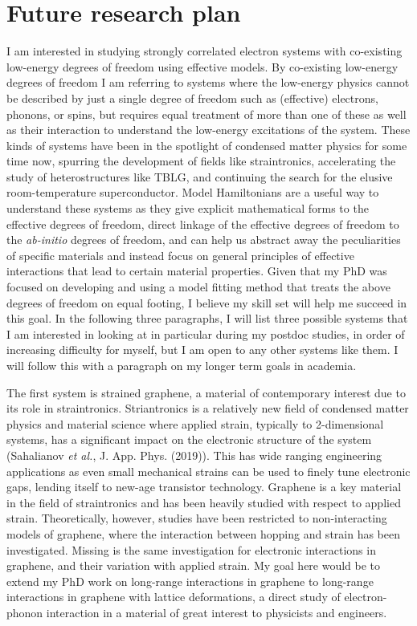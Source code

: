 \documentclass{article}
\begin{document}
\section{Future research plan}
I am interested in studying strongly correlated electron systems with co-existing low-energy degrees of freedom using effective models.
By co-existing low-energy degrees of freedom I am referring to systems where the low-energy physics cannot be described by just a single degree of freedom such as (effective) electrons, phonons, or spins, but requires equal treatment of more than one of these as well as their interaction to understand the low-energy excitations of the system.
These kinds of systems have been in the spotlight of condensed matter physics for some time now, spurring the development of fields like straintronics, accelerating the study of heterostructures like TBLG, and continuing the search for the elusive room-temperature superconductor.
Model Hamiltonians are a useful way to understand these systems as they give explicit mathematical forms to the effective degrees of freedom, direct linkage of the effective degrees of freedom to the \textit{ab-initio} degrees of freedom, and can help us abstract away the peculiarities of specific materials and instead focus on general principles of effective interactions that lead to certain material properties.
Given that my PhD was focused on developing and using a model fitting method that treats the above degrees of freedom on equal footing, I believe my skill set will help me succeed in this goal.
In the following three paragraphs, I will list three possible systems that I am interested in looking at in particular during my postdoc studies, in order of increasing difficulty for myself, but I am open to any other systems like them.
I will follow this with a paragraph on my longer term goals in academia.

The first system is strained graphene, a material of contemporary interest due to its role in straintronics.
Striantronics is a relatively new field of condensed matter physics and material science where applied strain, typically to 2-dimensional systems, has a significant impact on the electronic structure of the system (Sahalianov \textit{et al.}, J. App. Phys. (2019)).
This has wide ranging engineering applications as even small mechanical strains can be used to finely tune electronic gaps, lending itself to new-age transistor technology.
Graphene is a key material in the field of straintronics and has been heavily studied with respect to applied strain.
Theoretically, however, studies have been restricted to non-interacting models of graphene, where the interaction between hopping and strain has been investigated.
Missing is the same investigation for electronic interactions in graphene,  and their variation with applied strain. 
My goal here would be to extend my PhD work on long-range interactions in graphene to long-range interactions in graphene with lattice deformations, a direct study of electron-phonon interaction in a material of great interest to physicists and engineers.
\end{document}
